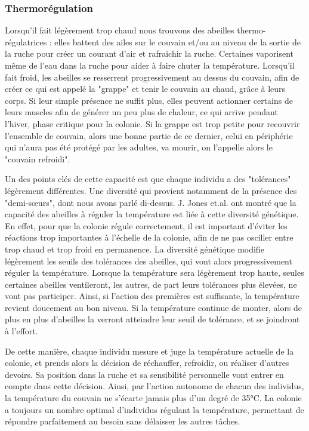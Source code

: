 			\subsubsection{Thermorégulation}	
			
			Lorsqu'il fait légèrement trop chaud nous trouvons des abeilles thermo-régulatrices : elles battent des ailes sur le couvain et/ou au niveau de la sortie de la ruche pour créer un courant d'air et rafraichir la ruche. Certaines vaporisent même de l'eau dans la ruche pour aider à faire chuter la température. Lorsqu'il fait froid, les abeilles se resserrent progressivement au dessus du couvain, afin de créer ce qui est appelé la "grappe" et tenir le couvain au chaud, grâce à leurs corps. Si leur simple présence ne suffit plus, elles peuvent actionner certains de leurs muscles afin de générer un peu plus de chaleur, ce qui arrive pendant l'hiver, phase critique pour la colonie. Si la grappe est trop petite pour recouvrir l'ensemble de couvain, alors une bonne partie de ce dernier, celui en périphérie qui n'aura pas été protégé par les adultes, va mourir, on l'appelle alors le "couvain refroidi".
					
			Un des points clés de cette capacité est que chaque individu a des "tolérances" légèrement différentes. Une diversité qui provient notamment de la présence des "demi-sœurs", dont nous avons parlé di-dessus. J. Jones et.al. \cite{jones_honey_2004} ont montré que la capacité des abeilles à réguler la température est liée à cette diversité génétique. En effet, pour que la colonie régule correctement, il est important d'éviter les réactions trop importantes à l'échelle de la colonie, afin de ne pas osciller entre trop chaud et trop froid en permanence. La diversité génétique modifie légèrement les seuils des tolérances des abeilles, qui vont alors progressivement réguler la température. Lorsque la température sera légèrement trop haute, seules certaines abeilles ventileront, les autres, de part leurs tolérances plus élevées, ne vont pas participer. Ainsi, si l'action des premières est suffisante, la température revient doucement au bon niveau. Si la température continue de monter, alors de plus en plus d'abeilles la verront atteindre leur seuil de tolérance, et se joindront à l'effort.
			
			De cette manière, chaque individu mesure et juge la température actuelle de la colonie, et prends alors la décision de réchauffer, refroidir, ou réaliser d'autres devoirs. Sa position dans la ruche et sa sensibilité personnelle vont entrer en compte dans cette décision. Ainsi, par l'action autonome de chacun des individus, la température du couvain ne s'écarte jamais plus d'un degré de 35°C. La colonie a toujours un nombre optimal d'individus régulant la température, permettant de répondre parfaitement au besoin sans délaisser les autres tâches.
			
